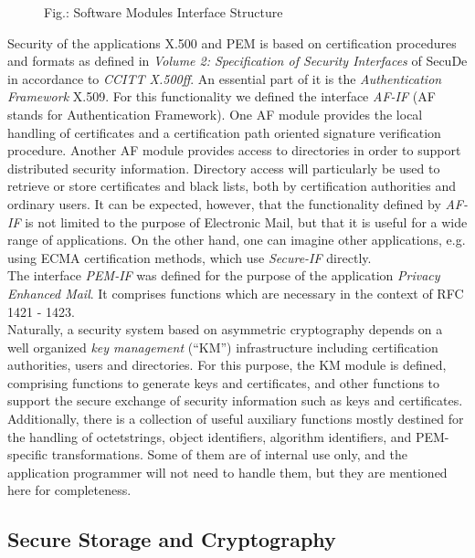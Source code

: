 \begin{figure}

{\footnotesize Fig.:
Software Modules Interface Structure}
\label{ifstruct}
\end{figure}

Security of the applications X.500 and PEM is based on
certification procedures and formats as defined in
{\em Volume 2: Specification of Security Interfaces}
of SecuDe in accordance to {\em CCITT X.500ff}.
An essential part of it
is the {\em Authentication Framework} X.509. For this functionality we defined the interface
{\em AF-IF} (AF stands for Authentication Framework).
One AF module provides the local handling of certificates
and a certification path oriented signature verification procedure.
Another AF module provides access to directories in order to
support distributed security information.
Directory access will particularly be used to retrieve or store
certificates and black lists,
both by certification authorities and ordinary users.
It can be expected, however, that
the functionality defined by {\em AF-IF} is not limited to the purpose of Electronic Mail, but that
it is useful for a wide range of applications. On the other hand, one can imagine other
applications, e.g. using ECMA certification methods, which use {\em Secure-IF} directly.
\\[1em]
The interface {\em PEM-IF} was defined for the purpose of the application {\em Privacy Enhanced 
Mail}. It comprises functions which are necessary in the context of RFC 1421 - 1423.
\\[1em]
Naturally, a security system based on asymmetric cryptography
depends on a well organized {\em key management} (``KM'') infrastructure
including certification authorities, users and directories.
For this purpose, the KM module is defined, comprising
functions to generate keys and certificates,
and other functions to support the secure exchange of security information
such as keys and certificates.
\\[1em]
Additionally, there is
a collection of useful auxiliary functions mostly destined for the
handling of octetstrings, object identifiers, algorithm identifiers, and PEM-specific
transformations. Some of them are of internal use only, and the application programmer will
not need to handle them, but they are mentioned here for completeness.

\subsection{Secure Storage and Cryptography}
\label{isw-sec}

